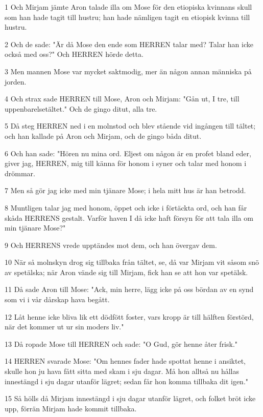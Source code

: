 \par 1 Och Mirjam jämte Aron talade illa om Mose för den etiopiska kvinnans skull som han hade tagit till hustru; han hade nämligen tagit en etiopisk kvinna till hustru.
\par 2 Och de sade: "Är då Mose den ende som HERREN talar med? Talar han icke också med oss?" Och HERREN hörde detta.
\par 3 Men mannen Mose var mycket saktmodig, mer än någon annan människa på jorden.
\par 4 Och strax sade HERREN till Mose, Aron och Mirjam: "Gån ut, I tre, till uppenbarelsetältet." Och de gingo ditut, alla tre.
\par 5 Då steg HERREN ned i en molnstod och blev stående vid ingången till tältet; och han kallade på Aron och Mirjam, och de gingo båda ditut.
\par 6 Och han sade: "Hören nu mina ord. Eljest om någon är en profet bland eder, giver jag, HERREN, mig till känna för honom i syner och talar med honom i drömmar.
\par 7 Men så gör jag icke med min tjänare Mose; i hela mitt hus är han betrodd.
\par 8 Muntligen talar jag med honom, öppet och icke i förtäckta ord, och han får skåda HERRENS gestalt. Varför haven I då icke haft försyn för att tala illa om min tjänare Mose?"
\par 9 Och HERRENS vrede upptändes mot dem, och han övergav dem.
\par 10 När så molnskyn drog sig tillbaka från tältet, se, då var Mirjam vit såsom snö av spetälska; när Aron vände sig till Mirjam, fick han se att hon var spetälsk.
\par 11 Då sade Aron till Mose: "Ack, min herre, lägg icke på oss bördan av en synd som vi i vår dårskap hava begått.
\par 12 Låt henne icke bliva lik ett dödfött foster, vars kropp är till hälften förstörd, när det kommer ut ur sin moders liv."
\par 13 Då ropade Mose till HERREN och sade: "O Gud, gör henne åter frisk."
\par 14 HERREN svarade Mose: "Om hennes fader hade spottat henne i ansiktet, skulle hon ju hava fått sitta med skam i sju dagar. Må hon alltså nu hållas innestängd i sju dagar utanför lägret; sedan får hon komma tillbaka dit igen."
\par 15 Så hölls då Mirjam innestängd i sju dagar utanför lägret, och folket bröt icke upp, förrän Mirjam hade kommit tillbaka.

